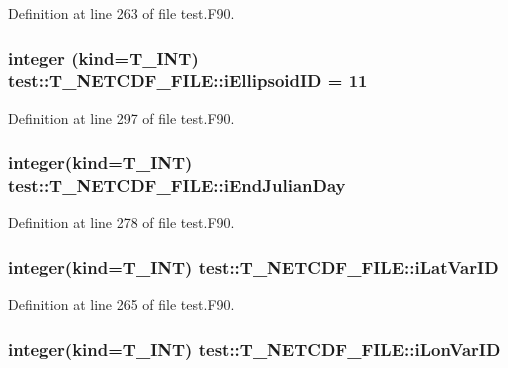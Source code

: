 Definition at line 263 of file test.F90.

\hypertarget{typetest_1_1_t___n_e_t_c_d_f___f_i_l_e_ab8d0a2ec68bd04229fdf7b2768c896c1}{
\subsubsection[{iEllipsoidID}]{\setlength{\rightskip}{0pt plus 5cm}integer (kind={\bf T\_\-INT}) {\bf test::T\_\-NETCDF\_\-FILE::iEllipsoidID} = 11}}
\label{typetest_1_1_t___n_e_t_c_d_f___f_i_l_e_ab8d0a2ec68bd04229fdf7b2768c896c1}


Definition at line 297 of file test.F90.

\hypertarget{typetest_1_1_t___n_e_t_c_d_f___f_i_l_e_a78182e5a6d1f3146b295526a6c0a4c90}{
\subsubsection[{iEndJulianDay}]{\setlength{\rightskip}{0pt plus 5cm}integer(kind={\bf T\_\-INT}) {\bf test::T\_\-NETCDF\_\-FILE::iEndJulianDay}}}
\label{typetest_1_1_t___n_e_t_c_d_f___f_i_l_e_a78182e5a6d1f3146b295526a6c0a4c90}


Definition at line 278 of file test.F90.

\hypertarget{typetest_1_1_t___n_e_t_c_d_f___f_i_l_e_aa614610ae97953c9ac727ac0a2928441}{
\subsubsection[{iLatVarID}]{\setlength{\rightskip}{0pt plus 5cm}integer(kind={\bf T\_\-INT}) {\bf test::T\_\-NETCDF\_\-FILE::iLatVarID}}}
\label{typetest_1_1_t___n_e_t_c_d_f___f_i_l_e_aa614610ae97953c9ac727ac0a2928441}


Definition at line 265 of file test.F90.

\hypertarget{typetest_1_1_t___n_e_t_c_d_f___f_i_l_e_a170b199ef720d7639680df773dfa4ad6}{
\subsubsection[{iLonVarID}]{\setlength{\rightskip}{0pt plus 5cm}integer(kind={\bf T\_\-INT}) {\bf test::T\_\-NETCDF\_\-FILE::iLonVarID}}}
\label{typetest_1_1_t___n_e_t_c_d_f___f_i_l_e_a170b199ef720d7639680df773dfa4ad6}


